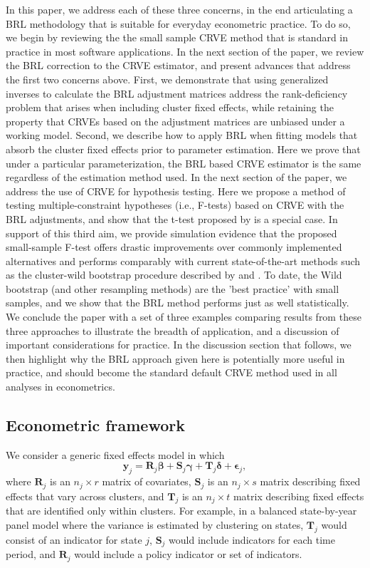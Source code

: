 \documentclass[12pt]{article}\usepackage[]{graphicx}\usepackage[]{color}
\newcommand{\bm}{\mathbf}
\newcommand{\bs}{\boldsymbol}
\begin{document}
In this paper, we address each of these three concerns, in the end articulating a BRL methodology that is suitable for everyday econometric practice. 
To do so, we begin by reviewing the the small sample CRVE method that is standard in practice in most software applications. 
In the next section of the paper, we review the BRL correction to the CRVE estimator, and present advances that address the first two concerns above. 
First, we demonstrate that using generalized inverses to calculate the BRL adjustment matrices address the rank-deficiency problem that arises when including cluster fixed effects, while retaining the property that CRVEs based on the adjustment matrices are unbiased under a working model. 
Second, we describe how to apply BRL when fitting models that absorb the cluster fixed effects prior to parameter estimation. 
Here we prove that under a particular parameterization, the BRL based CRVE estimator is the same regardless of the estimation method used.
In the next section of the paper, we address the use of CRVE for hypothesis testing.
Here we propose a method of testing multiple-constraint hypotheses (i.e., F-tests) based on CRVE with the BRL adjustments, and show that the t-test proposed by \citet{Bell2002bias} is a special case. 
In support of this third aim, we provide simulation evidence that the proposed small-sample F-test offers drastic improvements over commonly implemented alternatives and performs comparably with current state-of-the-art methods such as the cluster-wild bootstrap procedure described by \citet{Cameron2008bootstrap} and \citet{Webb2013wild}. 
To date, the Wild bootstrap (and other resampling methods) are the 'best practice' with small samples, and we show that the BRL method performs just as well statistically.
We conclude the paper with a set of three examples comparing results from these three approaches to illustrate the breadth of application, and a discussion of important considerations for practice.  
In the discussion section that follows, we then highlight why the BRL approach given here is potentially more useful in practice, and should become the standard default CRVE method used in all analyses in econometrics.

\subsection{Econometric framework}

We consider a generic fixed effects model in which
\begin{equation}
\label{eq:fixed_effects}
\bm{y}_j = \bm{R}_j \bs\beta + \bm{S}_j \bs\gamma + \bm{T}_j \bs\delta + \bs\epsilon_j,
\end{equation}
where $\bm{R}_j$ is an $n_j \times r$ matrix of covariates, $\bm{S}_j$ is an $n_j \times s$ matrix describing fixed effects that vary across clusters, and $\bm{T}_j$ is an $n_j \times t$ matrix describing fixed effects that are identified only within clusters. For example, in a balanced state-by-year panel model where the variance is estimated by clustering on states, $\bm{T}_j$ would consist of an indicator for state $j$, $\bm{S}_j$ would include indicators for each time period, and $\bm{R}_j$ would include a policy indicator or set of indicators.
\end{document}
